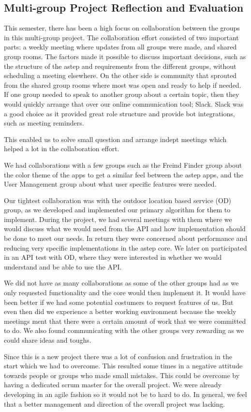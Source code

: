 \subsection{Multi-group Project Reflection and Evaluation}
This semester, there has been a high focus on collaboration between the groups in this multi-group project.
The collaboration effort consisted of two important parts: a weekly meeting where updates from all groups were made, and shared group rooms.
The factors made it possible to discuss important decisions, such as the structure of the \gls{astep} and requirements from the different groups, without scheduling a meeting elsewhere.
On the other side is community that sprouted from the shared group rooms where most was open and ready to help if needed.
If one group needed to speak to another group about a certain topic, then they would quickly arrange that over our online communication tool; Slack.
Slack was a good choice as it provided great role structure and provide bot integrations, such as meeting reminders.

This enabled us to solve small question and arrange indept meetings which helped a lot in the collaboration effort.

We had collaborations with a few groups such as the Freind Finder group about the color theme of the apps to get a similar feel between the \gls{astep} apps, and the User Management group about what user specific features were needed.

Our tightest collaboration was with the outdoor location based service (OD) group, as we developed and implemented our primary algorithm for them to implement.
During the project, we had several meetings with them where we would discuss what we would need from the API and how implementation should be done to meet our needs.
In return they were concerned about performance and reducing very specific implementations in the \gls{astep} core.
We later on participated in an API test with OD, where they were interested in whether we would understand and be able to use the API.

We did not have as many collaborations as some of the other groups had as we only requested functionality and the core would then implement it.
It would have been better if we had some potential costumers to request features of us.
But even then did we experience a better working environment because the weekly meetings ment that there were a certain amount of work that we were committed to do.
We also found communicating with the other groups very rewarding as we could share ideas and toughs.

Since this is a new project there was a lot of confusion and frustration in the start which we had to overcome.
This resulted some times in a negative attitude towards people or groups who made small mistakes.
This could be overcome by having a dedicated scrum master for the overall project.
We were already developing in an agile fashion so it would not be to hard to do.
In general, we feel that a better management and direction of the overall project was lacking.
